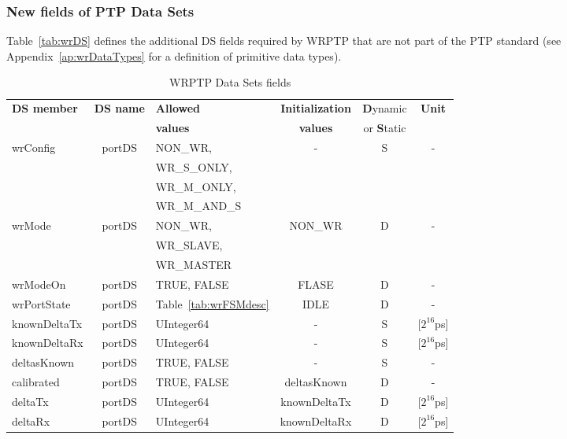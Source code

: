 \documentclass[a4paper, 12pt]{article}
\begin{document}
\subsubsection{New fields of PTP Data Sets}
Table~\ref{tab:wrDS} defines the additional DS fields required by WRPTP that are not part of
the PTP standard (see Appendix~\ref{ap:wrDataTypes} for a definition of primitive data types). 

\newpage

\begin{table}[ph!]
\caption{WRPTP Data Sets fields}
\centering
\begin{tabular}{| l     |     c        |           l             |   c   |   c   | c |  }        \hline   
   
\textbf{DS member}     	& \textbf{DS name}& \textbf{Allowed}       & \textbf{Initialization}& 
\textbf{D}ynamic & \textbf{Unit}            \\  
			&              & \textbf{values}           &\textbf{values}& 
or \textbf{S}tatic    &                    
                                                                                        \\ \hline
wrConfig   		& portDS       & NON\_WR,		   &       -       & S & - \\
			&	       & WR\_S\_ONLY,  		   &		   &   &   \\
			&	       & WR\_M\_ONLY, 		   &		   &   &   \\
			&	       & WR\_M\_AND\_S	           &               &   &   \\ \hline
wrMode			& portDS       & NON\_WR,\footnotemark[2]  & NON\_WR	   & D & - \\
			&	       & WR\_SLAVE,  		   &		   &   &   \\
			&	       & WR\_MASTER                &    	   &   &   \\ \hline
wrModeOn 		& portDS       & TRUE, FALSE               & FLASE         & D & - \\ \hline
wrPortState 		& portDS       & Table~\ref{tab:wrFSMdesc} & IDLE          & D & - \\ \hline
knownDeltaTx   		& portDS       & UInteger64                &       -       & S & [$2^{16}$ps]\footnotemark[3]\\ \hline
knownDeltaRx   		& portDS       & UInteger64                &       -       & S & [$2^{16}$ps]\footnotemark[3]\\ \hline
deltasKnown		& portDS       & TRUE, FALSE               &       -       & S & - \\ \hline
calibrated 		& portDS       & TRUE, FALSE               & deltasKnown   & D & - \\ \hline
deltaTx       		& portDS       & UInteger64                & knownDeltaTx  & D & [$2^{16}$ps]\footnotemark[3]\\ \hline
deltaRx     		& portDS       & UInteger64                & knownDeltaRx  & D & [$2^{16}$ps]\footnotemark[3]\\ \hline


\end{tabular}
\end{table}
\end{document}
